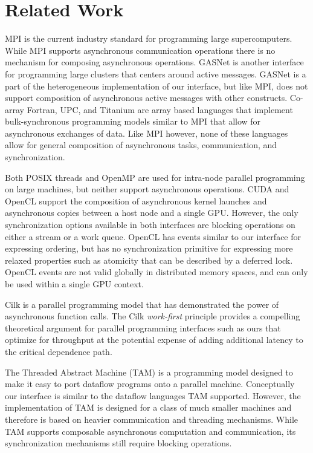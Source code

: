 
\section{Related Work}
\label{sec:related}

MPI is the current industry standard for programming large
super\-computers\cite{MPI}.  While MPI supports asynchronous
communication operations there is no mechanism for composing
asynchronous operations.  GASNet is another interface for programming
large clusters that centers around active messages\cite{GASNET07}.  GASNet
is a part of the heterogeneous implementation of our interface, but like
MPI, does not support composition of asynchronous active messages with
other constructs.  Co-array Fortran, UPC, and Titanium
are array based languages that implement bulk-synchronous
programming models similar to MPI that allow for asynchronous
exchanges of data\cite{COARRAY_FORTRAN,UPC99,JV:Yel98}.  Like
MPI however, none of these languages allow for general composition
of asynchronous tasks, communication, and synchronization.

Both POSIX threads and OpenMP\cite{OPENMP98} are used for intra-node parallel
programming on large machines, but neither support asynchronous
operations.  CUDA\cite{CUDA} and OpenCL\cite{Khronos:OpenCL} support
the composition of asynchronous kernel launches and asynchronous copies
between a host node and a single GPU.  However, the only synchronization
options available in both interfaces are blocking operations on either
a stream or a work queue.  OpenCL has events similar to our interface for
expressing ordering, but has no synchronization primitive for expressing
more relaxed properties such as atomicity that can be described by a
deferred lock.  OpenCL events are not valid globally in distributed memory
spaces, and can only be used within a single GPU context.

Cilk is a parallel programming model that has demonstrated the power of
asynchronous function calls\cite{CILK95}.  The Cilk {\em work-first}
principle provides a compelling theoretical argument for parallel programming
interfaces such as ours that optimize for throughput at the potential
expense of adding additional latency to the critical 
dependence path\cite{Frigo98}.

The Threaded Abstract Machine (TAM) is a programming model designed to
make it easy to port dataflow programs onto a parallel machine\cite{CullerGSvE93}.  
Conceptually our interface is similar to the dataflow languages TAM supported.
However, the implementation of TAM is designed for a class of much smaller machines
and therefore is based on heavier communication and threading mechanisms.
While TAM supports composable asynchronous computation and communication, its
synchronization mechanisms still require blocking operations.

